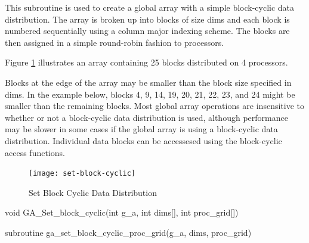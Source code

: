 \documentclass[10pt]{article}
\begin{document}
\begin{desc}

This subroutine is used to create a global array with a simple block-cyclic
data distribution. The array is broken up into blocks of size dims and each
block is numbered sequentially using a column major indexing scheme. The blocks
are then assigned in a simple round-robin fashion to processors.

Figure \ref{stblkcy} illustrates an array containing 25 blocks distributed on 4
processors.

Blocks at the edge of the array may be smaller than the block size specified in
dims. In the example below, blocks 4, 9, 14, 19, 20, 21, 22, 23, and 24 might
be smaller than the remaining blocks. Most global array operations are
insensitive to whether or not a block-cyclic data distribution is used,
although performance may be slower in some cases if the global array is using a
block-cyclic data distribution. Individual data blocks can be accessesed using
the block-cyclic access functions.

\begin{figure}
\centering
\texttt{[image: set-block-cyclic]}
\caption{Set Block Cyclic Data Distribution}
\label{stblkcy}
\end{figure}

\end{desc}


\begin{capi}
\begin{ccode}
void GA_Set_block_cyclic(int g_a, int dims[], int proc_grid[])
\end{ccode}
\begin{funcargs}
\end{funcargs}
\end{capi}

\begin{fapi}
\begin{fcode}
subroutine ga_set_block_cyclic_proc_grid(g_a, dims, proc_grid)
\end{fcode}
\begin{funcargs}
\end{funcargs}
\end{fapi}
\end{document}
